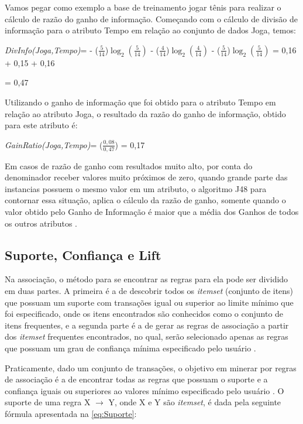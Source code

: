 \par
Vamos pegar como exemplo a base de treinamento jogar tênis para realizar o cálculo de razão do ganho de informação. Começando com o cálculo de divisão de informação para o atributo Tempo em relação ao conjunto de dados Joga, temos:

\textit{DivInfo(Joga,Tempo)}={ - ($\frac{5}{14}$)$\log_{2}(\frac{5}{14})$ - ($\frac{4}{14}$)$\log_{2}(\frac{4}{14})$ - ($\frac{5}{14}$)$\log_{2}(\frac{5}{14})$ = 0,16 + 0,15 + 0,16} 

= 0,47

\par
Utilizando o ganho de informação que foi obtido para o atributo Tempo em relação ao atributo Joga, o resultado da razão do ganho de informação, obtido para este atributo é:

\textit{GainRatio(Joga,Tempo)}={ ($\frac{0,08}{0,47}$) = 0,17} 

\par
Em casos de razão de ganho com resultados muito alto, por conta do denominador receber valores muito próximos de zero, quando grande parte das instancias possuem o mesmo valor em um atributo, o algoritmo J48 para contornar essa situação, aplica o cálculo da razão de ganho, somente quando o valor obtido pelo Ganho de Informação é maior que a média dos Ganhos de todos os outros atributos \cite{Carvalho2014}.



\subsection{Suporte, Confiança e Lift}

\par
Na associação, o método para se encontrar as regras para ela pode ser dividido em duas partes. A primeira é a de descobrir todos os \textit{itemset} (conjunto de itens) que possuam um suporte com transações igual ou superior ao limite mínimo que foi especificado, onde os itens encontrados são conhecidos como o conjunto de itens frequentes, e a segunda parte é a de gerar as regras de associação a partir dos \textit{itemset} frequentes encontrados, no qual, serão selecionado apenas as regras que possuam um grau de confiança mínima especificado pelo usuário \cite{Vasconcelos2004, LeandroSilva2014}.

\par
Praticamente, dado um conjunto de transações, o objetivo em minerar por regras de associação é a de encontrar todas as regras que possuam o suporte e a confiança iguais ou superiores ao valores mínimo especificado pelo usuário \cite{Vasconcelos2004}. O suporte de uma regra X $\rightarrow$ Y, onde X e Y são  \textit{itemset}, é dada pela seguinte fórmula apresentada na \autoref{eq:Suporte}:


